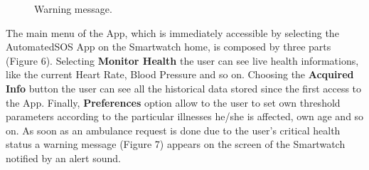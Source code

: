 \begin{enumerate}
\begin{figure}
\begin{center}
\begin{minipage}[c]{.40\textwidth}
          	\caption{Warning message.}
        \end{minipage}
      \end{center}
\end{figure}
The main menu of the App, which is immediately accessible by selecting the AutomatedSOS App on the Smartwatch home, is composed by three parts (Figure 6). Selecting \textbf{Monitor Health} the user can see live health informations, like the current Heart Rate, Blood Pressure and so on. Choosing the \textbf{Acquired Info} button the user can see all the historical data stored since the first access to the App. Finally, \textbf{Preferences} option allow to the user to set own threshold parameters according to the particular illnesses he/she is affected, own age and so on. As soon as an ambulance request is done due to the user's critical health status a warning message (Figure 7) appears on the screen of the Smartwatch notified by an alert sound.
\clearpage


\end{enumerate}
